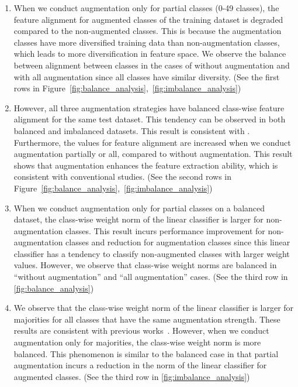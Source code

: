 \documentclass{article}
\renewcommand*\cite[1]{\citep{#1}}
\begin{document}
\begin{enumerate}
    \item When we conduct augmentation only for partial classes (0-49 classes), the feature alignment for augmented classes of the training dataset is degraded compared to the non-augmented classes. This is because the augmentation classes have more diversified training data than non-augmentation classes, which leads to more diversification in feature space. We observe the balance between alignment between classes in the cases of without augmentation and with all augmentation since all classes have similar diversity. (See the first rows in Figure~\ref{fig:balance_analysis},~\ref{fig:imbalance_analysis})
    \item However, all three augmentation strategies have balanced class-wise feature alignment for the same test dataset. This tendency can be observed in both balanced and imbalanced datasets. This result is consistent with \citet{kang2019decoupling}. Furthermore, the values for feature alignment are increased when we conduct augmentation partially or all, compared to without augmentation. This result shows that augmentation enhances the feature extraction ability, which is consistent with conventional studies. (See the second rows in Figure~\ref{fig:balance_analysis},~\ref{fig:imbalance_analysis})
    \item When we conduct augmentation only for partial classes on a balanced dataset, the class-wise weight norm of the linear classifier is larger for non-augmentation classes. This result incurs performance improvement for non-augmentation classes and reduction for augmentation classes since this linear classifier has a tendency to classify non-augmented classes with larger weight values. However, we observe that class-wise weight norms are balanced in ``without augmentation'' and ``all augmentation'' cases. (See the third row in \autoref{fig:balance_analysis})
    \item We observe that the class-wise weight norm of the linear classifier is larger for majorities for all classes that have the same augmentation strength. These results are consistent with previous works~\cite{kang2019decoupling, alshammari2022long}. However, when we conduct augmentation only for majorities, the class-wise weight norm is more balanced. This phenomenon is similar to the balanced case in that partial augmentation incurs a reduction in the norm of the linear classifier for augmented classes. (See the third row in \autoref{fig:imbalance_analysis})
\end{enumerate}
\end{document}
